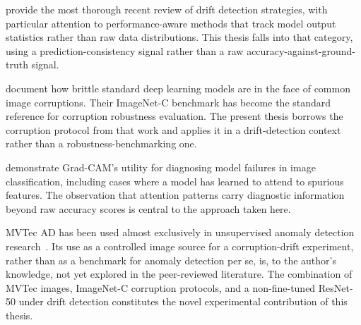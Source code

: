 \textcite{Bayram2022} provide the most thorough recent review of drift detection strategies, with particular attention to performance-aware methods that track model output statistics rather than raw data distributions. This thesis falls into that category, using a prediction-consistency signal rather than a raw accuracy-against-ground-truth signal.

\textcite{Hendrycks2019} document how brittle standard deep learning models are in the face of common image corruptions. Their ImageNet-C benchmark has become the standard reference for corruption robustness evaluation. The present thesis borrows the corruption protocol from that work and applies it in a drift-detection context rather than a robustness-benchmarking one.

\textcite{Selvaraju2019} demonstrate Grad-CAM's utility for diagnosing model failures in image classification, including cases where a model has learned to attend to spurious features. The observation that attention patterns carry diagnostic information beyond raw accuracy scores is central to the approach taken here.

MVTec AD has been used almost exclusively in unsupervised anomaly detection research~\autocite{Bergmann2019}. Its use as a controlled image source for a corruption-drift experiment, rather than as a benchmark for anomaly detection per se, is, to the author's knowledge, not yet explored in the peer-reviewed literature. The combination of MVTec images, ImageNet-C corruption protocols, and a non-fine-tuned ResNet-50 under drift detection constitutes the novel experimental contribution of this thesis.
